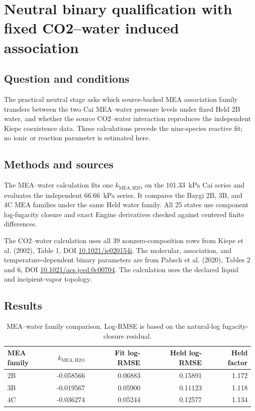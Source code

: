 \section{Neutral binary qualification with fixed CO2--water induced association}

\subsection{Question and conditions}

The practical neutral stage asks which source-backed MEA association family
transfers between the two Cai MEA--water pressure levels under fixed Held 2B
water, and whether the source CO2--water interaction reproduces the independent
Kiepe coexistence data. These calculations precede the nine-species reactive
fit; no ionic or reaction parameter is estimated here.

\subsection{Methods and sources}

The MEA--water calculation fits one $k_{\mathrm{MEA,H2O}}$ on the
\SI{101.33}{\kilo\pascal} Cai series and evaluates the independent
\SI{66.66}{\kilo\pascal} series. It compares the Baygi 2B, 3B, and 4C MEA
families under the same Held water family. All 25 states use component
log-fugacity closure and exact Engine derivatives checked against centered
finite differences.

The CO2--water calculation uses all 39 nonzero-composition rows from Kiepe
et al. (2002), Table 1, DOI \href{https://doi.org/10.1021/ie020154i}{10.1021/ie020154i}.
The molecular, association, and temperature-dependent binary parameters are
from Pabsch et al. (2020), Tables 2 and 6, DOI
\href{https://doi.org/10.1021/acs.jced.0c00704}{10.1021/acs.jced.0c00704}.
The calculation uses the declared liquid and incipient-vapor topology.

\subsection{Results}

\begin{table}[ht]
\centering
\caption{MEA--water family comparison. Log-RMSE is based on the natural-log
fugacity-closure residual.}
\begin{tabular}{lrrrr}
\toprule
MEA family & $k_{\mathrm{MEA,H2O}}$ & Fit log-RMSE & Held log-RMSE & Held factor \\
\midrule
2B & -0.058566 & 0.06883 & 0.15891 & 1.172 \\
3B & -0.019567 & 0.05900 & 0.11123 & 1.118 \\
4C & -0.036274 & 0.05244 & 0.12577 & 1.134 \\
\bottomrule
\end{tabular}
\end{table}

